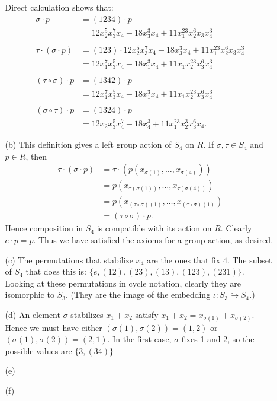 \documentclass[12pt]{article}
\theoremstyle{remark}
\theoremstyle{named}
\begin{document}
\begin{enumerate}
\begin{enumerate}
        Direct calculation shows that:
        \begin{align*}
            \sigma \cdot p &= (1 2 3 4) \cdot p \\
            &= 12x_2^5 x_3^7 x_4 - 18 x_3^3 x_4 + 11 x_1^{23} x_2^6 x_3 x_4^3 \\ 
            \\
            \tau \cdot (\sigma \cdot p) &= (123) \cdot 12x_2^5 x_3^7 x_4 - 18 x_3^3 x_4 + 11 x_1^{23} x_2^6 x_3 x_4^3 \\
            &= 12 x_1^7 x_3^5 x_4 - 18 x_1^3 x_4 + 11 x_1 x_2^{23} x_3^6 x_4^3 \\ 
            \\
            (\tau \circ \sigma) \cdot p &= (1342) \cdot p \\ 
            &= 12 x_1^7 x_3^5 x_4 - 18 x_1^3 x_4 + 11 x_1 x_2^{23} x_3^6 x_4^3 \\ 
            \\
            (\sigma \circ \tau) \cdot p &= (1324) \cdot p \\
            &= 12 x_2 x_3^5 x_4^7 - 18 x_4^3 + 11 x_1^{23} x_2^3 x_3^6 x_4.
        \end{align*}

        \item[(b)] This definition gives a left group action of \(S_4\) on \(R\). If \(\sigma, \tau \in S_4\) and \(p \in R\), then 
        \begin{align*}
            \tau \cdot (\sigma \cdot p) &= \tau \cdot (p(x_{\sigma(1)}, \dots, x_{\sigma(4)})) \\
            &= p(x_{\tau(\sigma(1))}, \dots, x_{\tau(\sigma(4))}) \\
            &= p(x_{(\tau \circ \sigma) (1)}, \dots, x_{(\tau \circ \sigma) (1)}) \\
            &= (\tau \circ \sigma) \cdot p.
        \end{align*}
        Hence composition in \(S_4\) is compatible with its action on \(R\). Clearly \(e \cdot p = p\). Thus we have satisfied the axioms for a group action, as desired.

        \item[(c)] The permutations that stabilize \(x_4\) are the ones that fix \(4\). The subset of \(S_4\) that does this is: \(\{e, (12), (23), (13), (123), (231)\}\). Looking at these permutations in cycle notation, clearly they are isomorphic to \(S_3\). 
        (They are the image of the embedding \(\iota : S_3 \hookrightarrow S_4\).)
        
        \item[(d)] An element \(\sigma\) stabilizes \(x_1 + x_2\) satisfy \(x_1 + x_2 = x_{\sigma(1)} + x_{\sigma(2)}\). Hence we must have either \((\sigma(1), \sigma(2)) = (1, 2)\) or \((\sigma(1), \sigma(2)) = (2, 1)\). In the first case, \(\sigma\) fixes 1 and 2, so the possible values are \(\{3, (34)\}\)
        \item[(e)] 
        \item[(f)]    
    \end{enumerate}
\end{enumerate}
\end{document}
